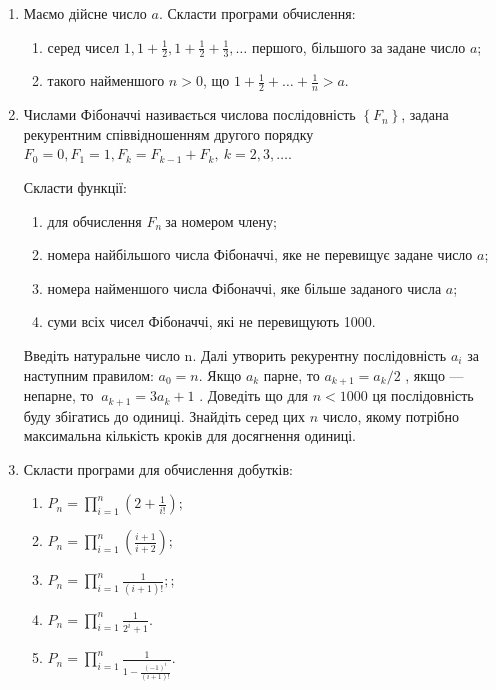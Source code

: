 \documentclass[]{article}
\makeatletter
\newcommand{\xslalph}[1]{\expandafter\@xslalph\csname c@#1\endcsname}
\newcommand{\@xslalph}[1]{%
    \ifcase#1\or а\or б\or в\or г\or д\or e\or є\or ж\or з\or i%
    \or й\or к\or л\or м\or н\or о\or п\or р\or с\or т%
    \or у\or ф\or х\or ц\or ч\or ш\or ю\or я\or аа\or бб\or вв %
    \else\@ctrerr\fi%
}
\makeatother
\begin{document}
\begin{enumerate}
\def\labelenumi{\arabic{enumi})}
\item
  Маємо дійсне число $a$. Скласти програми обчислення:
\begin{enumerate}[label=\xslalph*)]
\item серед чисел
\(1,1 + \frac{1}{2},1 + \frac{1}{2} + \frac{1}{3},\ldots\) першого,
більшого за задане число $a$;

\item такого найменшого $n>0$, що
\(1 + \frac{1}{2} + \ldots + \frac{1}{n} > a.\)

\end{enumerate}

\item
  Числами Фібоначчі називається числова послідовність
  \(\left\{ F_{n} \right\}\), задана рекурентним співвідношенням другого
  порядку
  \(F_{0} = 0,F_{1} = 1,F_{k} = F_{k - 1} + F_{k},\ k = 2,3,\ldots\).

Скласти функції:
\begin{enumerate}[label=\xslalph*)]
\item
для обчислення \(F_{n}\ \)за номером члену;
\item номера найбільшого числа Фібоначчі, яке не перевищує задане число
$a$;
\item номера найменшого числа Фібоначчі, яке більше заданого числа
$a$;
\item суми всіх чисел Фібоначчі, які не перевищують 1000.

\end{enumerate}
Введіть натуральне число n. Далі утворить рекурентну послідовність
\(a_{i}\) за наступним правилом: \(a_{0} = n\). Якщо \(a_{k}\) парне, то
\(a_{k + 1} = a_{k}/2\) , якщо --- непарне,
то \(\ a_{k + 1} = 3a_{k} + 1\) . Доведіть що для $n<1000$ ця
послідовність буду збігатись до одиниці. Знайдіть серед цих $n$ число,
якому потрібно максимальна кількість кроків для досягнення одиниці.

\item
  Скласти програми для обчислення добутків:
\begin{enumerate}[label=\xslalph*)]
\item \(P_{n} = \prod\limits_{i = 1}^{n}\left( 2 + \frac{1}{i!} \right);\) 
\item
\(P_{n} = \prod\limits_{i = 1}^{n}\left( \frac{i + 1}{i + 2} \right);\)
\item
\(P_{n} = \prod\limits_{i = 1}^{n}\frac{1}{(i + 1)!};\); 
\item
\(P_{n} = \prod\limits_{i = 1}^{n}\frac{1}{2^{i} + 1}.\)
\item
\(P_{n} = \prod\limits_{i = 1}^{n}\frac{1}{1 -\frac{(-1)^{i}}{(i+1)!}}.\)


\end{enumerate}
\end{enumerate}
\end{document}
